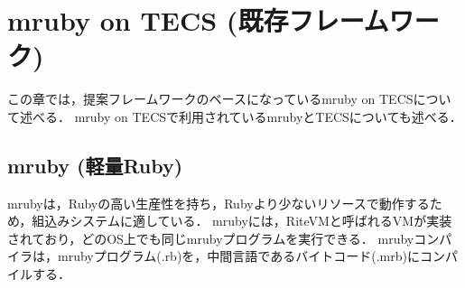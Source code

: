 \documentclass[submit,techrep]{ipsj}
\begin{document}
\vspace{-2mm}
\section{mruby on TECS (既存フレームワーク)}
\vspace{-2mm}
\label{sec:Background}
%
この章では，提案フレームワークのベースになっているmruby on TECSについて述べる．
mruby on TECSで利用されているmrubyとTECSについても述べる．
\vspace{-5mm}
\subsection{mruby (軽量Ruby)}

mrubyは，Rubyの高い生産性を持ち，Rubyより少ないリソースで動作するため，組込みシステムに適している．
mrubyには，RiteVMと呼ばれるVMが実装されており，どのOS上でも同じmrubyプログラムを実行できる．
mrubyコンパイラは，mrubyプログラム(.rb)を，中間言語であるバイトコード(.mrb)にコンパイルする．

\vspace{-5mm}
\end{document}
